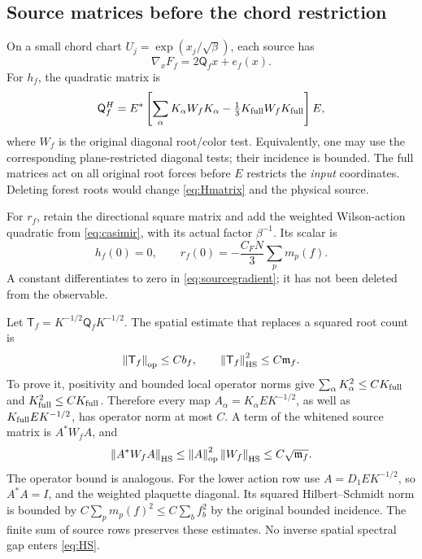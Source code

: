 \documentclass[11pt,letterpaper]{article}
\numberwithin{equation}{section}
\theoremstyle{definition}\newtheorem{definition}[theorem]{Definition}
\theoremstyle{remark}\newtheorem{remark}[theorem]{Remark}
\newcommand{\HS}{\mathrm{HS}}\newcommand{\supp}{\operatorname{supp}}
\newcommand{\mf}{\mathfrak m_f}\newcommand{\eps}{\varepsilon}
\newcommand{\norm}[1]{\left\lVert #1\right\rVert}
\newcommand{\cF}{C_F}
\begin{document}
\subsection{Source matrices before the chord restriction}

On a small chord chart $U_j=\exp(x_j/\sqrt\beta)$, each source has
\begin{equation}
 \nabla_xF_f=2\mathsf Q_fx+e_f(x).
 \label{eq:sourcegradient}
\end{equation}
For $h_f$, the quadratic matrix is
\begin{equation}
 \mathsf Q_f^H
 =E^*\left[\sum_\alpha K_\alpha W_fK_\alpha
                -\tfrac13K_{\rm full}W_fK_{\rm full}\right]E,
 \label{eq:Hmatrix}
\end{equation}
where $W_f$ is the original diagonal root/color test. Equivalently, one may use the corresponding plane-restricted diagonal tests; their incidence is bounded. The full matrices act on all original root forces before $E$ restricts the \emph{input} coordinates. Deleting forest roots would change \eqref{eq:Hmatrix} and the physical source.

For $r_f$, retain the directional square matrix and add the weighted Wilson-action quadratic from \eqref{eq:casimir}, with its actual factor $\beta^{-1}$. Its scalar is
\begin{equation}
 h_f(0)=0,\qquad r_f(0)=-\frac{\cF N}{3}\sum_pm_p(f).
 \label{eq:sourceconstant}
\end{equation}
A constant differentiates to zero in \eqref{eq:sourcegradient}; it has not been deleted from the observable.

Let $\mathsf T_f=K^{-1/2}\mathsf Q_fK^{-1/2}$. The spatial estimate that replaces a squared root count is
\begin{equation}
 \norm{\mathsf T_f}_{\rm op}\le Cb_f,\qquad
 \norm{\mathsf T_f}_{\HS}^2\le C\mf.
 \label{eq:HS}
\end{equation}
To prove it, positivity and bounded local operator norms give
$\sum_\alpha K_\alpha^2\le CK_{\rm full}$ and
$K_{\rm full}^2\le CK_{\rm full}$. Therefore every map
$A_\alpha=K_\alpha EK^{-1/2}$, as well as
$K_{\rm full}EK^{-1/2}$, has operator norm at most $C$.
A term of the whitened source matrix is $A^*W_fA$, and
\[
 \norm{A^*W_fA}_{\HS}\le\norm A_{\rm op}^2\norm{W_f}_{\HS}
 \le C\sqrt{\mf}.
\]
The operator bound is analogous. For the lower action row use
$A=D_1EK^{-1/2}$, so $A^*A=I$, and the weighted plaquette diagonal. Its squared Hilbert--Schmidt norm is bounded by
$C\sum_pm_p(f)^2\le C\sum_bf_b^2$ by the original bounded incidence. The finite sum of source rows preserves these estimates. No inverse spatial spectral gap enters \eqref{eq:HS}.
\end{document}
